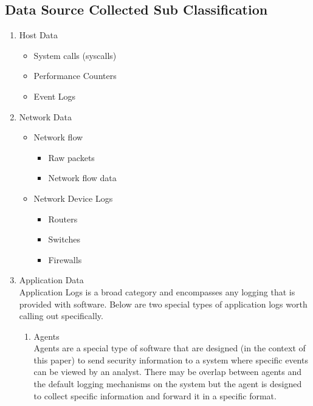 \documentclass[10pt]{IEEEtran}
\begin{document}
\subsection{Data Source Collected Sub Classification}
\begin{enumerate}
    \item Host Data\cite{jia2017big}\cite{marchetti2016analysis}
    \begin{itemize}
        \item System calls (syscalls) \cite{warrender1999detecting}\cite{hofmeyr1998intrusion}
        \item Performance Counters
        \item Event Logs
    \end{itemize}
    \item Network Data
        \begin{itemize}
            \item Network flow \cite{kim2013detection}
            \begin{itemize}
                \item Raw packets
                \item Network flow data
            \end{itemize}
            \item Network Device Logs\cite{horne2002management}
            \begin{itemize}
                \item Routers
                \item Switches
                \item Firewalls
            \end{itemize}
        \end{itemize}
    \item Application Data\cite{giura2012context}\cite{ten2010cybersecurity}
    \\Application Logs is a broad category and encompasses any logging that is provided with software. Below are two special types of application logs worth calling out specifically.
        \begin{enumerate}
            \item Agents\cite{garcia2009anomaly}
            \\Agents are a special type of software that are designed (in the context of this paper) to send security information to a system where specific events can be viewed by an analyst. There may be overlap between agents and the default logging mechanisms on the system but the agent is designed to collect specific information and forward it in a specific format.

\end{enumerate}
\end{enumerate}
\end{document}
